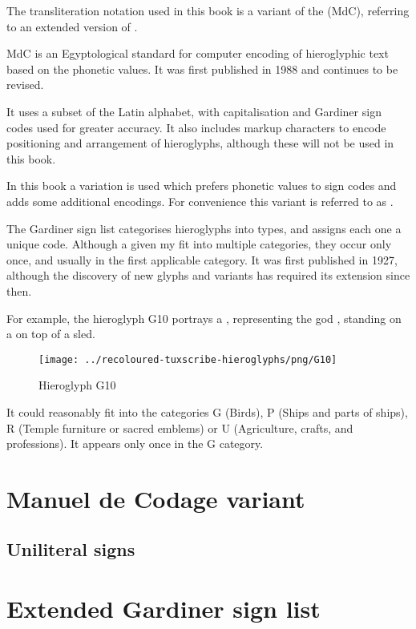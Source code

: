 The transliteration notation used in this book is a variant of the \textit{} (MdC), referring to an extended version of \textit{}.

MdC is an Egyptological standard for computer encoding of hieroglyphic text based on the phonetic values. It was first published in 1988 and continues to be revised.

It uses a subset of the Latin alphabet, with capitalisation and Gardiner sign codes used for greater accuracy. It also includes markup characters to encode positioning and arrangement of hieroglyphs, although these will not be used in this book.

In this book a variation is used which prefers phonetic values to sign codes and adds some additional encodings. For convenience this variant is referred to as .

The Gardiner sign list categorises hieroglyphs into types, and assigns each one a unique code. Although a given  my fit into multiple categories, they occur only once, and usually in the first applicable category. It was first published in 1927, although the discovery of new glyphs and variants has required its extension since then.

For example, the hieroglyph G10 portrays a , representing the god , standing on a  on top of a sled.

\begin{figure} [H]
\centering
\texttt{[image: ../recoloured-tuxscribe-hieroglyphs/png/G10]}
\caption{Hieroglyph G10}
\end{figure}

It could reasonably fit into the categories G (Birds), P (Ships and parts of ships), R (Temple furniture or sacred emblems) or U (Agriculture, crafts, and professions). It appears only once in the G category.


\section*{Manuel de Codage variant}

\subsection*{Uniliteral signs}


\section*{Extended Gardiner sign list}
